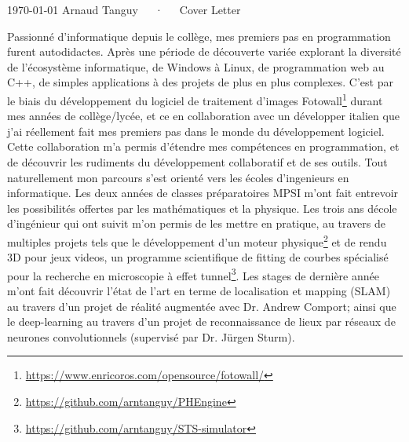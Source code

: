 \documentclass[11pt, a4paper]{awesome-cv}
\begin{document}
\makecvheader[R]

\makecvfooter
  {\today}
  {Arnaud Tanguy~~~·~~~Cover Letter}
  {}

\makelettertitle

\begin{cvletter}

  Passionné d'informatique depuis le collège, mes premiers pas en programmation furent autodidactes. Après une période de découverte variée explorant la diversité de l'écosystème informatique, de Windows à Linux, de programmation web au C++, de simples applications à des projets de plus en plus complexes. C'est par le biais du développement du logiciel de traitement d'images Fotowall\footnote{\url{https://www.enricoros.com/opensource/fotowall/}} durant mes années de collège/lycée, et ce en collaboration avec un développer italien que j'ai réellement fait mes premiers pas dans le monde du développement logiciel. Cette collaboration m'a permis d'étendre mes compétences en programmation, et de découvrir les rudiments du développement collaboratif et de ses outils. Tout naturellement mon parcours s'est orienté vers les écoles d'ingenieurs en informatique. Les deux années de classes préparatoires MPSI m'ont fait entrevoir les possibilités offertes par les mathématiques et la physique. Les trois ans décole d'ingénieur qui ont suivit m'on permis de les mettre en pratique, au travers de multiples projets tels que le développement d'un moteur physique\footnote{\url{https://github.com/arntanguy/PHEngine}} et de rendu 3D pour jeux videos, un programme scientifique de fitting de courbes spécialisé pour la recherche en microscopie à effet tunnel\footnote{\url{https://github.com/arntanguy/STS-simulator}}. Les stages de dernière année m'ont fait découvrir l'état de l'art en terme de localisation et mapping (SLAM) au travers d'un projet de réalité augmentée avec Dr. Andrew Comport; ainsi que le deep-learning au travers d'un projet de reconnaissance de lieux par réseaux de neurones convolutionnels (supervisé par Dr. Jürgen Sturm).


\end{cvletter}
\end{document}
